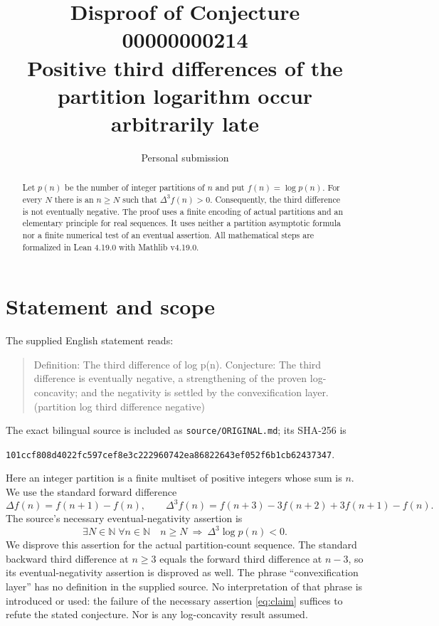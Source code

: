 \documentclass[11pt]{article}
\title{Disproof of Conjecture 00000000214\\\large Positive third differences of the partition logarithm occur arbitrarily late}
\author{Personal submission}
\date{}
\newcommand{\N}{\mathbb N}
\begin{document}
\maketitle
\begin{abstract}
Let $p(n)$ be the number of integer partitions of $n$ and put $f(n)=\log p(n)$.
For every $N$ there is an $n\ge N$ such that $\Delta^3 f(n)>0$.
Consequently, the third difference is not eventually negative.
The proof uses a finite encoding of actual partitions and an elementary principle for real sequences. It uses neither a partition asymptotic formula nor a finite numerical test of an eventual assertion. All mathematical steps are formalized in Lean 4.19.0 with Mathlib v4.19.0.
\end{abstract}

\section{Statement and scope}
The supplied English statement reads:
\begin{quote}
Definition: The third difference of log p(n). Conjecture: The third difference is eventually negative, a strengthening of the proven log-concavity; and the negativity is settled by the convexification layer. (partition log third difference negative)
\end{quote}
The exact bilingual source is included as \texttt{source/ORIGINAL.md}; its SHA-256 is
\begin{center}\small\texttt{101ccf808d4022fc597cef8e3c222960742ea86822643ef052f6b1cb62437347}.\end{center}
Here an integer partition is a finite multiset of positive integers whose sum is $n$. We use the standard forward difference
\[
\Delta f(n)=f(n+1)-f(n),\qquad
\Delta^3f(n)=f(n+3)-3f(n+2)+3f(n+1)-f(n).
\]
The source's necessary eventual-negativity assertion is
\begin{equation}\label{eq:claim}
\exists N\in\N\;\forall n\in\N\quad
 n\ge N\ \Longrightarrow\ \Delta^3\log p(n)<0.
\end{equation}
We disprove this assertion for the actual partition-count sequence. The standard backward third difference at $n\ge3$ equals the forward third difference at $n-3$, so its eventual-negativity assertion is disproved as well.
The phrase ``convexification layer'' has no definition in the supplied source. No interpretation of that phrase is introduced or used: the failure of the necessary assertion \eqref{eq:claim} suffices to refute the stated conjecture. Nor is any log-concavity result assumed.
\end{document}
